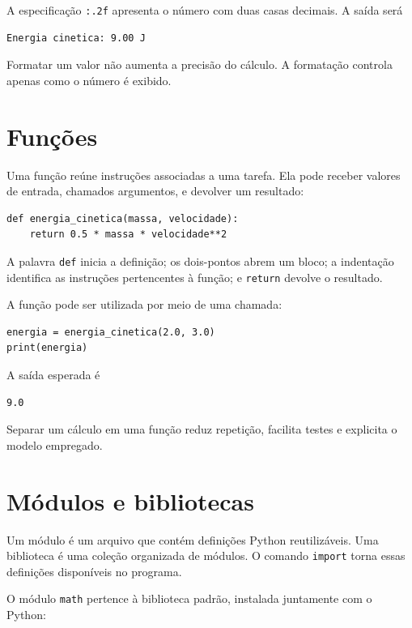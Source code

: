 A especificação \texttt{:.2f} apresenta o número com duas casas decimais. A saída será

\begin{lstlisting}[language={},numbers=none]
Energia cinetica: 9.00 J
\end{lstlisting}

Formatar um valor não aumenta a precisão do cálculo. A formatação controla apenas como o número é exibido.

\section{Funções}

Uma função reúne instruções associadas a uma tarefa. Ela pode receber valores de entrada, chamados argumentos, e devolver um resultado:

\begin{lstlisting}
def energia_cinetica(massa, velocidade):
    return 0.5 * massa * velocidade**2
\end{lstlisting}

A palavra \texttt{def} inicia a definição; os dois-pontos abrem um bloco; a indentação identifica as instruções pertencentes à função; e \texttt{return} devolve o resultado.

A função pode ser utilizada por meio de uma chamada:

\begin{lstlisting}
energia = energia_cinetica(2.0, 3.0)
print(energia)
\end{lstlisting}

A saída esperada é

\begin{lstlisting}[style=saidaesperada]
9.0
\end{lstlisting}

Separar um cálculo em uma função reduz repetição, facilita testes e explicita o modelo empregado.

\section{Módulos e bibliotecas}

Um módulo é um arquivo que contém definições Python reutilizáveis. Uma biblioteca é uma coleção organizada de módulos. O comando \texttt{import} torna essas definições disponíveis no programa.

O módulo \texttt{math} pertence à biblioteca padrão, instalada juntamente com o Python:

